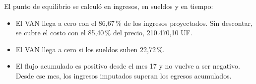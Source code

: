 El punto de equilibrio se calculó en ingresos, en sueldos y en tiempo:
\begin{itemize}
  \item El VAN llega a cero con el 86,67\,\% de los ingresos proyectados. Sin descontar, se cubre el costo con el 85,40\,\% del precio, 210.470,10 UF.
  \item El VAN llega a cero si los sueldos suben 22,72\,\%.
  \item El flujo acumulado es positivo desde el mes 17 y no vuelve a ser negativo. Desde ese mes, los ingresos imputados superan los egresos acumulados.
\end{itemize}
